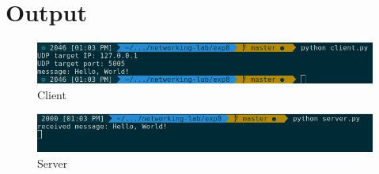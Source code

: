 \documentclass[a4paper,12pt]{article}
\begin{document}
\section{Output}

\pagebreak
\begin{figure}
	\includegraphics[width=\linewidth]{./client-udp.png}
	\caption{Client}
	\label{fig:client}
\end{figure}

\begin{figure}
	\includegraphics[width=\linewidth]{server-udp.png}
	\caption{Server}
	\label{fig:server}
\end{figure}
    
\end{document}
